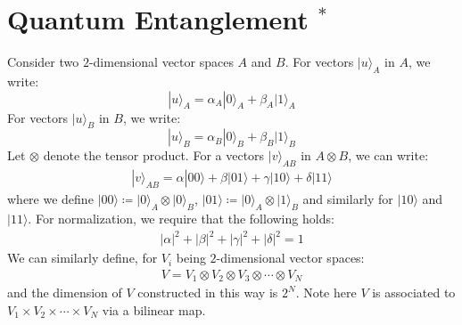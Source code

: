 \documentclass[11pt]{book}
\theoremstyle{break}
\theoremstyle{break}
\begin{document}
\section[Quantum Entanglement $^*$]{\color{red} Quantum Entanglement $^*$\color{black}}
Consider two $2$-dimensional vector spaces $A$ and $B$. For vectors $|u\rangle_A$ in $A$, we write: 
$$|u\rangle_A = \alpha_A |0\rangle_A + \beta_A |1\rangle_A$$
For vectors $|u\rangle_B$ in $B$, we write:
$$|u\rangle_B = \alpha_B |0\rangle_B + \beta_B |1\rangle_B$$
Let $\otimes $ denote the tensor product. For a vectors $|v\rangle_{AB}$ in $A\otimes B$, we can write:
\begin{align*}
|v\rangle_{AB} = \alpha |00\rangle + \beta |01\rangle + \gamma|10\rangle + \delta |11\rangle
\end{align*}
where we define $|00\rangle \coloneqq |0\rangle_A \otimes |0\rangle_B$, $|01\rangle \coloneqq |0\rangle_A \otimes |1\rangle_B$ and similarly for $|10\rangle$ and $|11\rangle$. For normalization, we require that the following holds:
\begin{align*}
|\alpha|^2 + |\beta|^2 + |\gamma|^2 + |\delta|^2 = 1
\end{align*}
We can similarly define, for $V_i$ being $2$-dimensional vector spaces:
\begin{align*}
V = V_1 \otimes V_2\otimes V_3 \otimes \cdots \otimes V_N
\end{align*}
and the dimension of $V$ constructed in this way is $2^N$. Note here $V$ is associated to $V_1 \times V_2\times \cdots \times V_N$ via a bilinear map. \\
\end{document}
